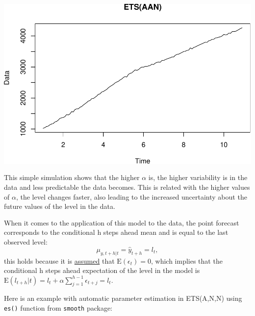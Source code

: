 \documentclass[
]{book}
\newenvironment{Shaded}{\begin{snugshade}}{\end{snugshade}}
\newcommand{\AttributeTok}[1]{\textcolor[rgb]{0.77,0.63,0.00}{#1}}
\newcommand{\ConstantTok}[1]{\textcolor[rgb]{0.00,0.00,0.00}{#1}}
\newcommand{\DecValTok}[1]{\textcolor[rgb]{0.00,0.00,0.81}{#1}}
\newcommand{\FloatTok}[1]{\textcolor[rgb]{0.00,0.00,0.81}{#1}}
\newcommand{\FunctionTok}[1]{\textcolor[rgb]{0.00,0.00,0.00}{#1}}
\newcommand{\NormalTok}[1]{#1}
\newcommand{\OtherTok}[1]{\textcolor[rgb]{0.56,0.35,0.01}{#1}}
\newcommand{\SpecialCharTok}[1]{\textcolor[rgb]{0.00,0.00,0.00}{#1}}
\newcommand{\StringTok}[1]{\textcolor[rgb]{0.31,0.60,0.02}{#1}}
\theoremstyle{definition}
\theoremstyle{definition}
\theoremstyle{definition}
\theoremstyle{definition}
\theoremstyle{remark}
\begin{document}
\includegraphics{adam_files/figure-latex/unnamed-chunk-23-1.pdf}

This simple simulation shows that the higher \(\alpha\) is, the higher variability is in the data and less predictable the data becomes. This is related with the higher values of \(\alpha\), the level changes faster, also leading to the increased uncertainty about the future values of the level in the data.

When it comes to the application of this model to the data, the point forecast corresponds to the conditional h steps ahead mean and is equal to the last observed level:
\begin{equation}
    \mu_{y,t+h|t} = \hat{y}_{t+h} = l_{t} ,
  \label{eq:ETSANNForecast}
\end{equation}
this holds because it is \protect\hyperlink{assumptions}{assumed} that \(\text{E}(\epsilon_t)=0\), which implies that the conditional h steps ahead expectation of the level in the model is \(\text{E}(l_{t+h}|t)=l_t+\alpha\sum_{j=1}^{h-1}\epsilon_{t+j} = l_t\).

Here is an example with automatic parameter estimation in ETS(A,N,N) using \texttt{es()} function from \texttt{smooth} package:

\begin{Shaded}
\end{Shaded}
\end{document}
